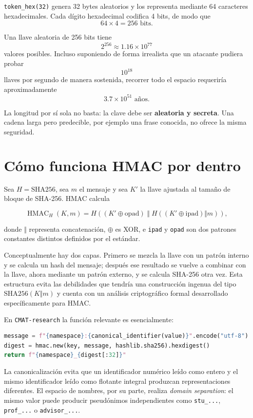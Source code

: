 \documentclass[11pt,a4paper]{article}
\begin{document}
\texttt{token\_hex(32)} genera 32 bytes aleatorios y los representa mediante 64 caracteres hexadecimales. Cada dígito hexadecimal codifica 4 bits, de modo que
\[
64\times 4=256\text{ bits}.
\]

Una llave aleatoria de 256 bits tiene
\[
2^{256}\approx 1.16\times10^{77}
\]
valores posibles. Incluso suponiendo de forma irrealista que un atacante pudiera probar
\[
10^{18}
\]
llaves por segundo de manera sostenida, recorrer todo el espacio requeriría aproximadamente
\[
3.7\times10^{51}\text{ años}.
\]

La longitud por sí sola no basta: la clave debe ser \textbf{aleatoria y secreta}. Una cadena larga pero predecible, por ejemplo una frase conocida, no ofrece la misma seguridad.

\section{Cómo funciona HMAC por dentro}

Sea $H=\mathrm{SHA256}$, sea $m$ el mensaje y sea $K'$ la llave ajustada al tamaño de bloque de SHA-256. HMAC calcula

\[
\operatorname{HMAC}_H(K,m)
=
H\!\left(
(K'\oplus \mathrm{opad})
\;\Vert\;
H\!\left((K'\oplus \mathrm{ipad})\Vert m\right)
\right),
\]

donde $\Vert$ representa concatenación, $\oplus$ es XOR, e \texttt{ipad} y \texttt{opad} son dos patrones constantes distintos definidos por el estándar.

Conceptualmente hay dos capas. Primero se mezcla la llave con un patrón interno y se calcula un hash del mensaje; después ese resultado se vuelve a combinar con la llave, ahora mediante un patrón externo, y se calcula SHA-256 otra vez. Esta estructura evita las debilidades que tendría una construcción ingenua del tipo $\mathrm{SHA256}(K\Vert m)$ y cuenta con un análisis criptográfico formal desarrollado específicamente para HMAC.

En \texttt{CMAT-research} la función relevante es esencialmente:

\begin{lstlisting}[language=Python]
message = f"{namespace}:{canonical_identifier(value)}".encode("utf-8")
digest = hmac.new(key, message, hashlib.sha256).hexdigest()
return f"{namespace}_{digest[:32]}"
\end{lstlisting}

La canonicalización evita que un identificador numérico leído como entero y el mismo identificador leído como flotante integral produzcan representaciones diferentes. El espacio de nombres, por su parte, realiza \textit{domain separation}: el mismo valor puede producir pseudónimos independientes como \texttt{stu\_...}, \texttt{prof\_...} o \texttt{advisor\_...}.
\end{document}
